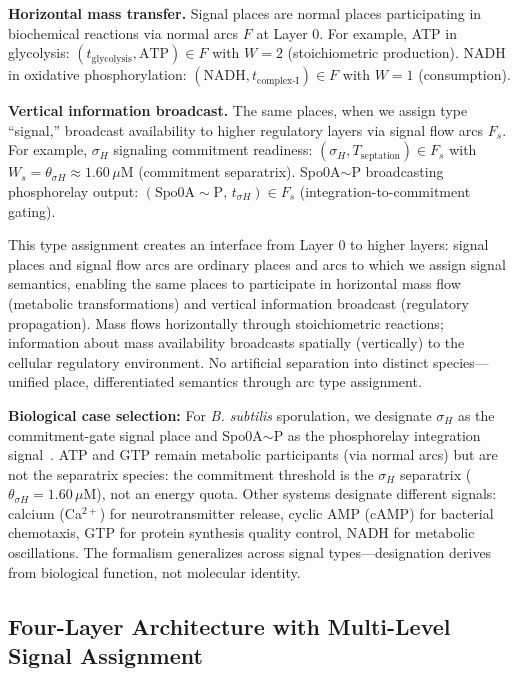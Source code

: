 \documentclass[10pt,letterpaper]{article}
\begin{document}
\vspace{3pt}
\noindent\textbf{Horizontal mass transfer.} Signal places are normal places participating in biochemical reactions via normal arcs $F$ at Layer 0. For example, ATP in glycolysis: $(t_{\text{glycolysis}}, \text{ATP}) \in F$ with $W = 2$ (stoichiometric production). NADH in oxidative phosphorylation: $(\text{NADH}, t_{\text{complex-I}}) \in F$ with $W = 1$ (consumption).

\vspace{3pt}
\noindent\textbf{Vertical information broadcast.} The same places, when we assign type ``signal,'' broadcast availability to higher regulatory layers via signal flow arcs $F_s$. For example, $\sigma_H$ signaling commitment readiness: $(\sigma_H, T_{\text{septation}}) \in F_s$ with $W_s = \theta_{\sigma H} \approx 1.60\,\mu$M (commitment separatrix). Spo0A$\sim$P broadcasting phosphorelay output: $(\text{Spo0A}{\sim}\text{P},\, t_{\sigma H}) \in F_s$ (integration-to-commitment gating).

This type assignment creates an interface from Layer 0 to higher layers: signal places and signal flow arcs are ordinary places and arcs to which we assign signal semantics, enabling the same places to participate in horizontal mass flow (metabolic transformations) and vertical information broadcast (regulatory propagation). Mass flows horizontally through stoichiometric reactions; information about mass availability broadcasts spatially (vertically) to the cellular regulatory environment. No artificial separation into distinct species---unified place, differentiated semantics through arc type assignment.

\textbf{Biological case selection:} For \textit{B. subtilis} sporulation, we designate $\sigma_H$ as the commitment-gate signal place and Spo0A$\sim$P as the phosphorelay integration signal~\cite{fujita2005}. ATP and GTP remain metabolic participants (via normal arcs) but are not the separatrix species: the commitment threshold is the $\sigma_H$ separatrix ($\theta_{\sigma H} = 1.60\,\mu$M), not an energy quota. Other systems designate different signals: calcium (Ca$^{2+}$) for neurotransmitter release, cyclic AMP (cAMP) for bacterial chemotaxis, GTP for protein synthesis quality control, NADH for metabolic oscillations. The formalism generalizes across signal types---designation derives from biological function, not molecular identity.

\subsection{Four-Layer Architecture with Multi-Level Signal Assignment}\label{sec:four_layer}
\end{document}
